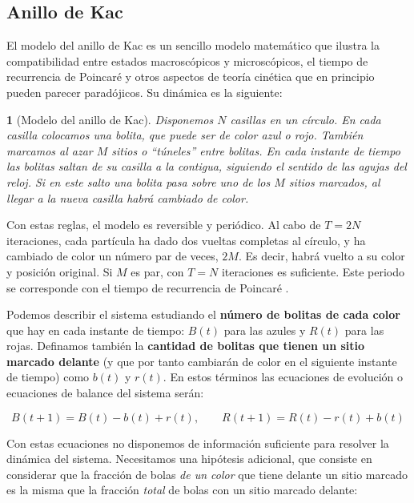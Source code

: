 \documentclass[11pt, a4paper]{article} %
\theoremstyle{named}
\newtheorem*{namedtheorem}{}
\begin{document}
\subsection{Anillo de Kac}\label{sec:ring}

El modelo del anillo de Kac \cite{salcido} es un sencillo modelo matemático que ilustra la compatibilidad entre estados macroscópicos y microscópicos, el tiempo de recurrencia de Poincaré y otros aspectos de teoría cinética que en principio pueden parecer paradójicos. Su dinámica es la siguiente:

\begin{namedtheorem}[Modelo del anillo de Kac]
Disponemos $N$ casillas en un círculo. En cada casilla colocamos una bolita, que puede ser de color azul o rojo. También marcamos al azar $M$ sitios o ``túneles'' entre bolitas. En cada instante de tiempo las bolitas saltan de su casilla a la contigua, siguiendo el sentido de las agujas del reloj. Si en este salto una bolita pasa sobre uno de los $M$ sitios marcados, al llegar a la nueva casilla habrá cambiado de color.
\end{namedtheorem}

Con estas reglas, el modelo es reversible y periódico. Al cabo de $T = 2N$ iteraciones, cada partícula ha dado dos vueltas completas al círculo, y ha cambiado de color un número par de veces, $2M$. Es decir, habrá vuelto a su color y posición original. Si $M$ es par, con $T=N$ iteraciones es suficiente. Este periodo se corresponde con el tiempo de recurrencia de Poincaré \cite{gottwald}.

Podemos describir el sistema estudiando el \textbf{número de bolitas de cada color} que hay en cada instante de tiempo: $B(t)$ para las azules y $R(t)$ para las rojas. Definamos también la \textbf{cantidad de bolitas que tienen un sitio marcado delante} (y que por tanto cambiarán de color en el siguiente instante de tiempo) como $b(t)$ y $r(t)$. En estos términos las ecuaciones de evolución o ecuaciones de balance del sistema serán:

\begin{equation}\label{eq:kacEvol}
B(t+1) = B(t) - b(t) + r(t), \qquad
R(t+1) = R(t) - r(t) + b(t)
\end{equation}

Con estas ecuaciones no disponemos de información suficiente para resolver la dinámica del sistema. Necesitamos una hipótesis adicional, que consiste en considerar que la fracción de bolas \textit{de un color} que tiene delante un sitio marcado es la misma que la fracción \textit{total} de bolas con un sitio marcado delante:
\end{document}

